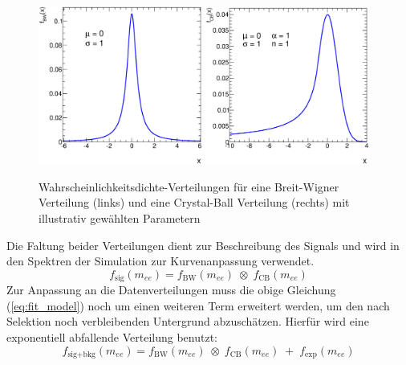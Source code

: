 \begin{figure}
    \centering
    \includegraphics[width=0.48\textwidth]{plots/breit_wigner}
    \hfill
    \includegraphics[width=0.48\textwidth]{plots/crystal_ball}
    \caption[Wahrscheinlichkeitsdichte-Verteilungen für eine Breit-Wigner
        Verteilung und eine Crystal-Ball Verteilung]
        {Wahrscheinlichkeitsdichte-Verteilungen für eine Breit-Wigner
        Verteilung (links) und eine Crystal-Ball Verteilung (rechts) mit
        illustrativ gewählten Parametern}
    \label{fig:crystal_ball}
\end{figure}

Die Faltung beider Verteilungen dient zur Beschreibung des Signals und wird in
den Spektren der Simulation zur Kurvenanpassung verwendet.
\begin{equation}
    f_\text{sig}(m_{ee}) = f_\text{BW}(m_{ee}) \;\otimes\; f_\text{CB}(m_{ee})
    \label{eq:fit_model}
\end{equation}
Zur Anpassung an die Datenverteilungen muss die obige Gleichung
(\ref{eq:fit_model}) noch um einen weiteren Term erweitert werden, um den nach
Selektion noch verbleibenden Untergrund abzuschätzen. Hierfür wird eine
exponentiell abfallende Verteilung benutzt:
\begin{equation}
    f_\text{sig+bkg}(m_{ee}) = f_\text{BW}(m_{ee})
        \;\otimes\; f_\text{CB}(m_{ee})
        \;+\; f_\text{exp}(m_{ee})
    \label{eq:fit_model_bkg}
\end{equation}

